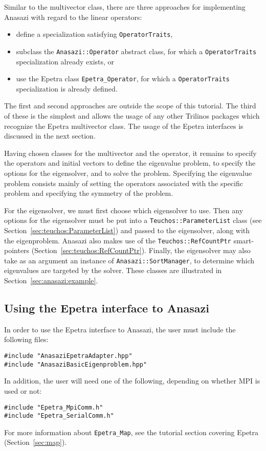 Similar to the multivector class, there are three approaches for
implementing Anasazi with regard to the linear operators:
\begin{itemize}
\item define a specialization satisfying \verb!OperatorTraits!,
\item subclass the \verb!Anasazi::Operator! abstract class, for which a
\verb!OperatorTraits! specialization already exists, or
\item use the Epetra class \verb!Epetra_Operator!, 
for which a \verb!OperatorTraits! specialization is already defined.
\end{itemize}

The first and second approaches are outside the scope of this
tutorial. The third of these is the simplest and allows the usage of
any other Trilinos packages which recognize the Epetra multivector
class. The usage of the Epetra interfaces is discussed in the next
section.

Having chosen classes for the multivector and the operator, it remains
to specify the operators and initial vectors to define the eigenvalue
problem, to specify the options for the eigensolver, and to solve the
problem. Specifying the eigenvalue problem consists mainly of setting
the operators associated with the specific problem and specifying the
symmetry of the problem. 

For the eigensolver, we must first choose which eigensolver to use.
Then any options for the eigensolver must be put into a
\verb!Teuchos::ParameterList! class (see
Section~\ref{sec:teuchos:ParameterList}) and passed to the
eigensolver, along with the eigenproblem. Anasazi also makes use of
the \verb!Teuchos::RefCountPtr! smart-pointers
(Section~\ref{sec:teuchos:RefCountPtr}). Finally, the eigensolver may
also take as an argument an instance of \verb!Anasazi::SortManager!,
to determine which eigenvalues are targeted by the solver. These
classes are illustrated in Section~\ref{sec:anasazi:example}.


\subsection{Using the Epetra interface to Anasazi}
\label{sec:anasazi:interface}

In order to use the Epetra interface to Anasazi, the user must include
the following files:
\begin{verbatim}
#include "AnasaziEpetraAdapter.hpp"
#include "AnasaziBasicEigenproblem.hpp"
\end{verbatim}
In addition, the user will need one of the following, depending on
whether MPI is used or not:
\begin{verbatim}
#include "Epetra_MpiComm.h"
#include "Epetra_SerialComm.h"
\end{verbatim}
For more information about \verb!Epetra_Map!, see the tutorial section
covering Epetra (Section~\ref{sec:map}).

